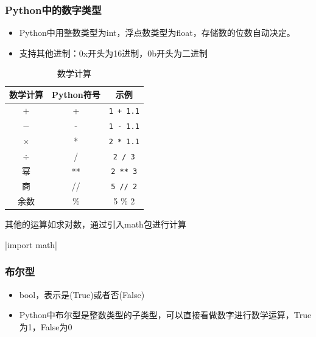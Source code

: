 \documentclass[10pt]{beamer}
\begin{document}
\begin{frame}
\frametitle{Python中的数字类型}
\begin{itemize}
    \item Python中用整数类型为int，浮点数类型为float，存储数的位数自动决定。
    \item 支持其他进制：0x开头为16进制，0b开头为二进制
\end{itemize}

\begin{table}
    \caption{数学计算}
\begin{tabular}{ccc}
    \toprule
    数学计算 & Python符号 & 示例 \\
    \midrule
     $+$ & + & \texttt{1 + 1.1} \\
     $-$ & - & \texttt{1 - 1.1} \\
     $\times$ & * & \texttt{2 * 1.1} \\
     $\div$ & / & \texttt{2 / 3} \\
     幂 & ** & \texttt{2 ** 3} \\
     商 & // & \texttt{5 // 2} \\
     余数 & \% & 5 \% 2 \\
     \bottomrule
\end{tabular}
\end{table}

其他的运算如求对数，通过引入math包进行计算

|import math|

\end{frame}

\begin{frame}
    \frametitle{布尔型}
    \begin{itemize}
        \item bool，表示是(True)或者否(False)
        \item Python中布尔型是整数类型的子类型，可以直接看做数字进行数学运算，True为1，False为0
    \end{itemize}
\end{frame}
\end{document}
